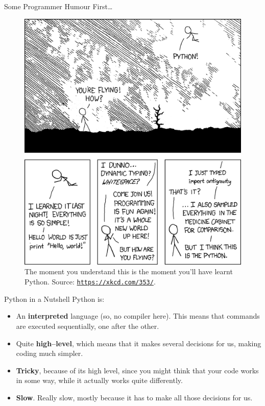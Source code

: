 \documentclass[aspectratio=169, 12pt, xcolor=table]{beamer}
\newcommand{\ohref}[1]{\href{#1}{\texttt{#1}}}
\begin{document}
	\begin{frame}{Some Programmer Humour First\ldots}
		\begin{figure}
			\centering
			\includegraphics[height=0.65\textheight]{./assets/xkcd_python.png}
			\caption{The moment you understand this is the moment you'll have learnt Python. Source: \ohref{https://xkcd.com/353/}.}
		\end{figure}
	\end{frame}
	
	\begin{frame}{Python in a Nutshell}
		Python is:
		\begin{itemize}
			\item An \textbf{interpreted} language (so, no compiler here). This means that commands are executed sequentially, one after the other.
			\item Quite \textbf{high--level}, which means that it makes several decisions for us, making coding much simpler.
			\item \textbf{Tricky}, because of its high level, since you might think that your code works in some way, while it actually works quite differently.
			\item \textbf{Slow}. Really slow, mostly because it has to make all those decisions for us.
		\end{itemize}
	\end{frame}
\end{document}
